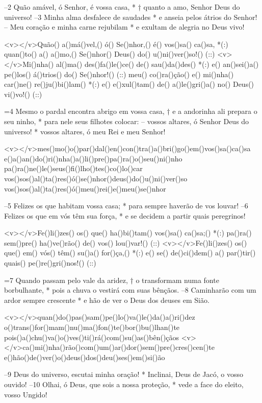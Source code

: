 –2 Quão amável, ó Senhor, é vossa casa, *
† quanto a amo, Senhor Deus do universo!
–3 Minha alma desfalece de saudades *
e anseia pelos átrios do Senhor!
– Meu coração e minha carne rejubilam *
e exultam de alegria no Deus vivo!

<v></v>Quão() a()má()vel,() ó() Se()nhor,() é() vos()sa() ca()sa, *(:)
quan()to() a() a()mo,() Se()nhor() Deus() do() u()ni()ver()so!() (::)
<v></v>Mi()nha() al()ma() des()fa()le()ce() de() sau()da()des() *(:)
e() an()sei()a() pe()los() á()trios() do() Se()nhor!() (::)
meu() co()ra()ção() e() mi()nha() car()ne() re()ju()bi()lam() *(:)
e() e()xul()tam() de() a()le()gri()a() no() Deus() vi()vo!() (::)

=4 Mesmo o pardal encontra abrigo em vossa casa, †
e a andorinha ali prepara o seu ninho, *
para nele seus filhotes colocar:
– vossos altares, ó Senhor Deus do universo! *
vossos altares, ó meu Rei e meu Senhor!

<v></v>mes()mo()o()par()dal()en()con()tra()a()bri()go()em()vos()sa()ca()sa
e()a()an()do()ri()nha()a()li()pre()pa()ra()o()seu()ni()nho
pa()ra()ne()le()seus()fi()lho()tes()co()lo()car
vos()sos()al()ta()res()ó()se()nhor()deus()do()u()ni()ver()so
vos()sos()al()ta()res()ó()meu()rei()e()meu()se()nhor

–5 Felizes os que habitam vossa casa; *
para sempre haverão de vos louvar!
–6 Felizes os que em vós têm sua força, *
e se decidem a partir quais peregrinos!

<v></v>Fe()li()zes() os() que() ha()bi()tam() vos()sa() ca()sa;() *(:)
pa()ra() sem()pre() ha()ve()rão() de() vos() lou()var!() (::)
<v></v>Fe()li()zes() os() que() em() vós() têm() su()a() for()ça,() *(:)
e() se() de()ci()dem() a() par()tir() quais() pe()re()gri()nos!() (::)

=7 Quando passam pelo vale da aridez, †
o transformam numa fonte borbulhante, *
pois a chuva o vestirá com suas bênçãos.
–8 Caminharão com um ardor sempre crescente *
e hão de ver o Deus dos deuses em Sião.

<v></v>quan()do()pas()sam()pe()lo()va()le()da()a()ri()dez
o()trans()for()mam()nu()ma()fon()te()bor()bu()lhan()te
pois()a()chu()va()o()ves()ti()rá()com()su()as()bên()çãos
<v></v>ca()mi()nha()rão()com()um()ar()dor()sem()pre()cres()cen()te
e()hão()de()ver()o()deus()dos()deu()ses()em()si()ão

–9 Deus do universo, escutai minha oração! *
Inclinai, Deus de Jacó, o vosso ouvido!
–10 Olhai, ó Deus, que sois a nossa proteção, *
vede a face do eleito, vosso Ungido!

